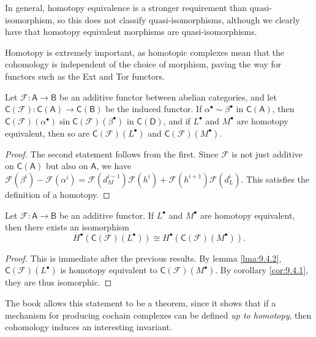 In general, homotopy equivalence is a stronger requirement than quasi-isomorphism, so this does not classify quasi-isomorphisms, although we clearly have that homotopy equivalent morphisms are quasi-isomorphisms.

Homotopy is extremely important, as homotopic complexes mean that the cohomology is independent of the choice of morphism, paving the way for functors such as the Ext and Tor functors.

\begin{lemma}\label{lma:9.4.2}
	Let $\mathscr{F} : \mathsf{A}  \to \mathsf{B} $ be an additive functor between abelian categories, and let $\mathsf{C} (\mathscr{F} ): \mathsf{C} (\mathsf{A} ) \to \mathsf{C} (\mathsf{B} )$ be the induced functor. If $\alpha ^{\bullet} \sim \beta ^{\bullet} $ in $\mathsf{C} (\mathsf{A} )$, then $\mathsf{C} (\mathscr{F} )(\alpha ^{\bullet} )\sin \mathsf{C} (\mathscr{F} )(\beta ^{\bullet} )$ in $\mathsf{C} (\mathsf{D} )$, and if $L^{\bullet} $ and $M^{\bullet} $ are homotopy equivalent, then so are $\mathsf{C} (\mathscr{F} )(L^{\bullet} )$ and $\mathsf{C} (\mathscr{F} )(M^{\bullet} )$.
\end{lemma}
\begin{proof}
	The second statement follows from the first. Since $\mathscr{F} $ is not just additive on $\mathsf{C} (\mathsf{A}) $ but also on $\mathsf{A} $, we have
	$\mathscr{F} (\beta ^i)-\mathscr{F} (\alpha ^i)=\mathscr{F} (d^{i-1} _M)\mathscr{F} (h^i)+\mathscr{F} (h^{i+1} )\mathscr{F} (d_L^i)$. This satisfies the definition of a homotopy.
\end{proof}
\begin{theorem}\label{thm:9.4.1}
	Let $\mathscr{F} : \mathsf{A}  \to \mathsf{B} $ be an additive functor. If $L^{\bullet} $ and $M^{\bullet} $ are homotopy equivalent, then there exists an isomorphism
	\[
		H^{\bullet} (\mathsf{C} (\mathscr{F} )(L^{\bullet} ))\cong H^{\bullet} (\mathsf{C} (\mathscr{F} )(M^{\bullet} ))
	.\]
\end{theorem}
\begin{proof}
	This is immediate after the previous results. By lemma \ref{lma:9.4.2}, $\mathsf{C} (\mathscr{F} )(L^{\bullet} )$ is homotopy equivalent to $\mathsf{C} (\mathscr{F} )(M^{\bullet} )$. By corollary \ref{cor:9.4.1}, they are thus isomorphic.
\end{proof}

The book allows this statement to be a theorem, since it shows that if a mechanism for producing cochain complexes can be defined \emph{up to homotopy}, then cohomology induces an interesting invariant.
